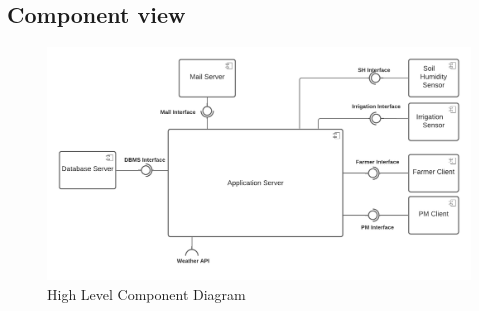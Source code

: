 \documentclass[10pt]{article} %
\begin{document}
\subsection{Component view}
\begin{figure}[h]
    \centering
    \includegraphics[scale=0.43]{images/hl_component.png}
    \caption{High Level Component Diagram}
    \label{fig:hl_component}
\end{figure}
\end{document}
